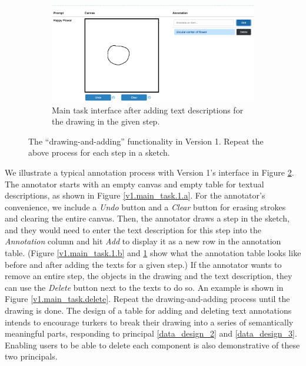 \begin{figure}[!htb]
\ContinuedFloat
\begin{subfigure}{\textwidth}
    \centering
    \includegraphics[width=.8\linewidth]{data_collection/v1_after_enter_text.png}  
    \caption{Main task interface after adding text descriptions for the drawing in the given step.}
    \label{v1.main_task.1.c}
\end{subfigure}
\caption{The ``drawing-and-adding'' functionality in Version 1. Repeat the above process for each step in a sketch.}
\label{v1.main_task.1}
\end{figure}

We illustrate a typical annotation process with Version 1's interface in Figure \ref{v1.main_task.1}. 
The annotator starts with an empty canvas and empty table for textual descriptions, as shown in Figure \ref{v1.main_task.1.a}. For the annotator's convenience, we include a \textit{Undo} button and a \textit{Clear} button for erasing strokes and clearing the entire canvas.  
Then, the annotator draws a step in the sketch, and they would need to enter the text description for this step into the \textit{Annotation} column and hit \textit{Add} to display it as a new row in the annotation table. (Figure \ref{v1.main_task.1.b} and \ref{v1.main_task.1.c} show what the annotation table looks like before and after adding the texts for a given step.) If the annotator wants to remove an entire step, the objects in the drawing and the text description, they can use the \textit{Delete} button next to the texts to do so. An example is shown in Figure \ref{v1.main_task.delete}.
Repeat the drawing-and-adding process until the drawing is done. 
The design of a table for adding and deleting text annotations intends to encourage turkers to break their drawing into a series of semantically meaningful parts, responding to principal \ref{data_design_2} and \ref{data_design_3}.  Enabling users to be able to delete each component is also demonstrative of these two principals. 


